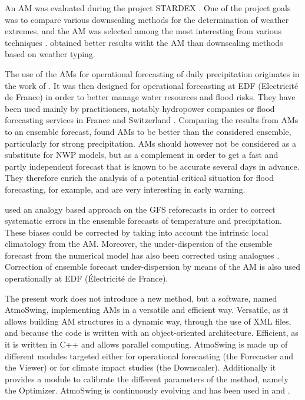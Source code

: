 \documentclass[review]{elsarticle}
\begin{document}
An AM was evaluated during the project STARDEX \citep[\textit{STAtistical and Regional dynamical Downscaling of EXtremes for European regions}, see][]{Goodess2003, Stardex2005}. One of the project goals was to compare various downscaling methods for the determination of weather extremes, and the AM was selected among the most interesting from various techniques \citep{Maheras2005, Schmidli2007}. \citet{Bliefernicht2010} obtained better results witht the AM than downscaling methods based on weather typing.

The use of the AMs for operational forecasting of daily precipitation originates in the work of \citet{Duband1970, Duband1974, Duband1981}. It was then designed for operational forecasting at EDF (Electricit\'{e} de France) in order to better manage water resources and flood risks. They have been used mainly by practitioners, notably hydropower companies \citep{Desaint2008a,BenDaoud2009,Obled2014} or flood forecasting services in France and Switzerland \citep{Marty2010,GarciaHernandez2009b,Horton2012}. Comparing the results from AMs to an ensemble forecast, \citet{Marty2010} found AMs to be better than the considered ensemble, particularly for strong precipitation. AMs should however not be considered as a substitute for NWP models, but as a complement in order to get a fast and partly independent forecast that is known to be accurate several days in advance. They therefore enrich the analysis of a potential critical situation for flood forecasting, for example, and are very interesting in early warning.

\citet{Hamill2006} used an analogy based approach on the GFS reforecasts in order to correct systematic errors in the ensemble forecasts of temperature and precipitation. These biases could be corrected by taking into account the intrinsic local climatology from the AM. Moreover, the under-dispersion of the ensemble forecast from the numerical model has also been corrected using analogues \citep{Hamill2006}. Correction of ensemble forecast under-dispersion by means of the AM is also used operationally at EDF (\'{E}lectricit\'{e} de France).

The present work does not introduce a new method, but a software, named AtmoSwing, implementing AMs in a versatile and efficient way. Versatile, as it allows building AM structures in a dynamic way, through the use of XML files, and because the code is written with an object-oriented architecture. Efficient, as it is written in C++ and allows parallel computing. AtmoSwing is made up of different modules targeted either for operational forecasting (the Forecaster and the Viewer) or for climate impact studies (the Downscaler). Additionally it provides a module to calibrate the different parameters of the method, namely the Optimizer. AtmoSwing is continuously evolving and has been used in \citet{Horton2012, Horton2017a, Horton2017b, Horton2018a} and \citet{Horton2018b}.
\end{document}
